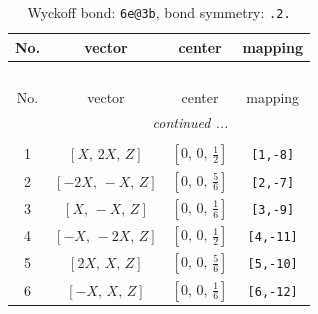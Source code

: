 \documentclass[fleqn,8pt]{jsarticle}
\begin{document}
\renewcommand{\arraystretch}{1.2}
\begin{longtable}{cccc}
\caption{Wyckoff bond: {\tt 6e@3b}, bond symmetry: {\tt .2.}}
 \\
 \hline \hline
No. & vector & center & mapping \\ \hline \endfirsthead

\multicolumn{3}{l}{\tablename\ \thetable{}} \\
 \hline \hline
No. & vector & center & mapping \\ \hline \endhead

 \hline \hline
\multicolumn{3}{r}{\footnotesize\it continued ...} \\ \endfoot

 \hline \hline
\multicolumn{3}{r}{} \\ \endlastfoot

1 & $\left[ X,\, 2 X,\, Z \right]$ & $\left[ 0,\, 0,\, \frac{1}{2} \right]$ & {\tt [1,-8]} \\ \hline
2 & $\left[ - 2 X,\, - X,\, Z \right]$ & $\left[ 0,\, 0,\, \frac{5}{6} \right]$ & {\tt [2,-7]} \\ \hline
3 & $\left[ X,\, - X,\, Z \right]$ & $\left[ 0,\, 0,\, \frac{1}{6} \right]$ & {\tt [3,-9]} \\ \hline
4 & $\left[ - X,\, - 2 X,\, Z \right]$ & $\left[ 0,\, 0,\, \frac{1}{2} \right]$ & {\tt [4,-11]} \\ \hline
5 & $\left[ 2 X,\, X,\, Z \right]$ & $\left[ 0,\, 0,\, \frac{5}{6} \right]$ & {\tt [5,-10]} \\ \hline
6 & $\left[ - X,\, X,\, Z \right]$ & $\left[ 0,\, 0,\, \frac{1}{6} \right]$ & {\tt [6,-12]} \\
\end{longtable}
\renewcommand{\arraystretch}{1.2}
\end{document}
